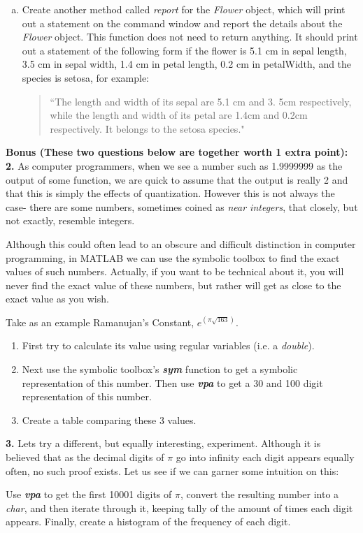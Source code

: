 \documentclass[11pt]{article}
\begin{document}
\begin{enumerate}[a.]
	\item Create another method called \textit{report} for the \textit{Flower} object,
	which will print out a statement on the command window and report
	the details about the \textit{Flower} object.
	This function does not need to return anything.
	It should print out a statement of the following form if the flower
	is 5.1 cm in sepal length, 3.5 cm in sepal width, 1.4 cm in petal length,
	0.2 cm in petalWidth, and the species is setosa, for example:
	\begin{quote}
		``The length and width of its sepal are 5.1 cm and 3. 5cm respectively,
		while the length and width of its petal are 1.4cm and 0.2cm respectively.
		It belongs to the setosa species."
	\end{quote}

	\end{enumerate}


	\noindent
	\newline
	\textbf{Bonus (These two questions below are together worth 1 extra point):}\\

	\textbf{2.} As computer	programmers, when we see a number such as 1.9999999 as the output of
	some function, we are quick to assume that the output is really 2 and that this is
	simply the effects of quantization. However this is not always the case- there are
	some numbers, sometimes coined as \textit{near integers}, that closely, but not exactly,
	resemble integers.

	Although this could often lead to an obscure and difficult distinction in computer programming, 
	in MATLAB we can use the symbolic toolbox to find the exact values of such numbers.
	Actually, if you want to be technical about it, you will never find the exact value of these numbers, but
	rather will get as close to the exact value as you wish.

	Take as an example Ramanujan's Constant, $e^{(\pi\sqrt{163})}$.
	
	\begin{enumerate}[a]
		\item First try to calculate its value using regular variables (i.e. a \textit{double}).
	
		\item Next use the symbolic toolbox's \textit{\textbf{sym}} function to get a symbolic 
		representation of this number. Then use \textit{\textbf{vpa}} to get a 30 and 100 digit
		representation of this number.
		
		\item Create a table comparing these 3 values. 
	\end{enumerate}

	\textbf{3.} Lets try a different, but equally interesting, experiment. Although it is believed
	that as the decimal digits of $\pi$ go into infinity each digit appears equally often, 
	no such proof exists. Let us see if we can garner some intuition on this:

	Use \textit{\textbf{vpa}} to get the first 10001 digits of $\pi$, convert the resulting number
	into a \textit{char}, and then iterate through it, keeping tally of the amount of times each digit
	appears. Finally, create a histogram of the frequency of each digit.
\end{document}

